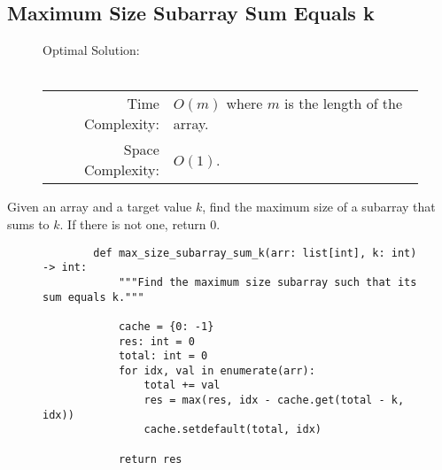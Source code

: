 
\subsection{Maximum Size Subarray Sum Equals k}

\begin{figure}[H]
    Optimal Solution:\\\\
    \begin{tabular}{rl}
        Time Complexity:& \(O(m)\) where \(m\) is the length of the array.\\
        Space Complexity:& \(O(1)\).
    \end{tabular}
\end{figure}

Given an array and a target value \(k\), find the maximum size of a subarray
that sums to \(k\). If there is not one, return \(0\).

\begin{figure}[H]
    \centering
    \begin{verbatim}
        def max_size_subarray_sum_k(arr: list[int], k: int) -> int:
            """Find the maximum size subarray such that its sum equals k."""

            cache = {0: -1}
            res: int = 0
            total: int = 0
            for idx, val in enumerate(arr):
                total += val
                res = max(res, idx - cache.get(total - k, idx))
                cache.setdefault(total, idx)

            return res
    \end{verbatim}
\end{figure}
